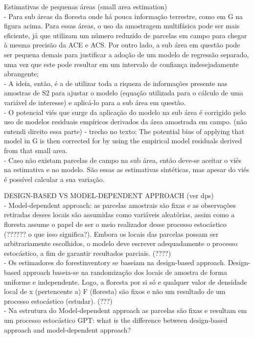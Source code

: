 \documentclass[
]{article}
\begin{document}
Estimativas de pequenas áreas (small area estimation)\\
- Para sub áreas da floresta onde há pouca informação terrestre, como em
G na figura acima. Para essas áreas, o uso da amostragem multifásica
pode ser mais eficiente, já que utilizam um número reduzido de parcelas
em campo para chegar à mesma precisão da ACE e ACS. Por outro lado, a
sub área em questão pode ser pequena demais para justificar a adoção de
um modelo de regressão separado, uma vez que este pode resultar em um
intervalo de confiança indesejadamente abrangente;\\
- A ideia, então, é a de utilizar toda a riqueza de informações presente
nas amostras de S2 para ajustar o modelo (equação utilizada para o
cálculo de uma variável de interesse) e aplicá-lo para a sub área em
questão.\\
- O potencial viés que surge da aplicação do modelo na sub área é
corrigido pelo uso de modelos residuais empíricos derivados da área
amostrada em campo. (não entendi direito essa parte) - trecho no texto:
The potential bias of applying that model in G is then corrected for by
using the empirical model residuals derived from that small area.\\
- Caso não existam parcelas de campo na sub área, então deve-se aceitar
o viés na estimativa e no modelo. São essas as estimativas sintéticas,
mas apesar do viés é possível calcular a sua variação.

DESIGN-BASED VS MODEL-DEPENDENT APPROACH (ver dps)\\
- Model-dependent approach: as parcelas amostrais são fixas e as
observações retiradas desses locais são assumidas como variáveis
aleatórias, assim como a floresta assume o papel de ser o meio
realizador desse processo estocástico (?????? o que isso significa?).
Embora os locais das parcelas possam ser arbitrariamente escolhidos, o
modelo deve escrever adequadamente o processo estocástico, a fim de
garantir resultados parciais. (????)\\
- Os estimadores do forestinventory se baseiam na design-based approach.
Design-based approach baseia-se na randomização dos locais de amostra de
forma uniforme e independente. Logo, a floresta por si só e qualquer
valor de densidade local de x (pertencente a) F (floresta) são fixos e
não um resultado de um processo estocástico (estudar). (???)\\
- Na estrutura do Model-dependent approach as parcelas são fixas e
resultam em um processo estocástico GPT: what is the difference between
design-based approach and model-dependent approach?
\end{document}
